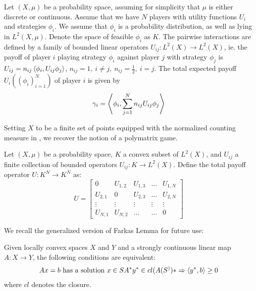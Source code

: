 \begin{definition} \label{def:lin_game}
  Let $(X,\mu)$ be a probability space, assuming for simplicity that $\mu$ is either discrete or  continuous. Assume that we have $N$ players with utility functions $U_i$ and strategies $\phi_i$. We assume that $\phi_i$ is a probability distribution, as well as lying in $L^2(X,\mu)$. Denote the space of feasible $\phi_i$ as $K$. The pairwise interactions are defined by a family of bounded linear operators $U_{ij}: L^2(X)\to L^2(X)$, ie. the payoff of player $i$ playing strategy $\phi_i$ against player $j$ with strategy $\phi_j$ is $U_{ij}=n_{ij}\ip{\phi_i}{U_{ij} \phi_j}$, $n_{ij}=1,~i\neq j,~ n_{ij}=\frac{1}{2},~i=j$. The total expected payoff $U_i((\phi_i)_{i=1}^N)$ of player $i$ is given by
  \begin{equation}
    \gamma_i = \ip{\phi_i}{\sum_{j=1}^N  n_{ij} U_{ij} \phi_j}
  \end{equation}
\end{definition}
\begin{remark}
  Setting $X$ to be a finite set of points equipped with the normalized counting measure in , we recover the notion of a polymatrix game.
\end{remark}
\begin{definition}
  \label{def:total_payoff}
  Let $(X,\mu)$ be a probability space, $K$ a convex subset of $L^2(X)$, and $U_{ij}$ a finite collection of bounded operators $U_{ij}: K \to L^2(X)$. Define the total payoff operator $U:K^N \to K^N$ as:
  \begin{equation}
    U =
    \begin{bmatrix}
        0 & U_{1,2} & U_{1,3} &\dots & U_{1,N} \\
        U_{2,1} & 0 & U_{2,3} &\dots & U_{2,N} \\
        \vdots & \vdots & \vdots & \vdots & \vdots \\
        U_{N,1} & U_{N,2} & \dots & \dots & 0
    \end{bmatrix}
  \end{equation}
\end{definition}
We recall the generalized version of Farkas Lemma for future use:
\begin{lemma}
  \label{lem:farkas_lemma}
Given locally convex spaces $X$ and $Y$ and a strongly continuous linear map $A:X\to Y$, the following conditions are equivalent:
  \begin{align}
    Ax = b \text{ has a solution } x\in S
    A^* y^* \in cl(A(S^))* \Rightarrow \left \langle y^*,b \right \rangle \geq 0
  \end{align}
	where $cl$ denotes the closure.
\end{lemma}
